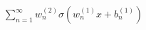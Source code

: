 \documentclass[preview]{standalone}
\begin{document}
\begin{align*}
\sum_{n=1}^{\infty} w_n^{(2)} \sigma(w_n^{(1)} x + b_n^{(1)})
\end{align*}
\end{document}
